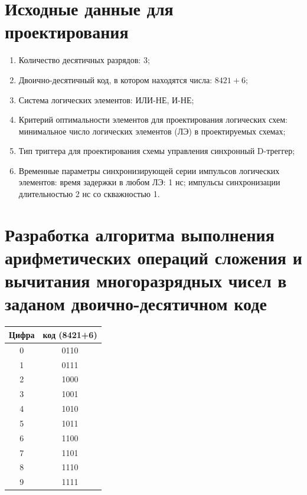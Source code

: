 \documentclass[a4paper,14pt]{article}
\begin{document}


\section{Исходные данные для проектирования}


\begin{enumerate}
	\item Количество десятичных разрядов: $3$;
	\item Двоично-десятичный код, в котором находятся числа: $8421+6$;
	\item Система логических элементов: ИЛИ-НЕ, И-НЕ;
	\item Критерий оптимальности элементов для проектирования логических схем: минимальное число логических элементов (ЛЭ) в проектируемых схемах;
	\item Тип триггера для проектирования схемы управления синхронный D-треггер;
	\item Временные параметры синхронизирующей серии импульсов логических элементов: 
	время задержки в любом ЛЭ: 1 нс; 
	импульсы синхронизации длительностью 2 нс со скважностью 1. 
\end{enumerate}

\section{Разработка алгоритма выполнения арифметических операций сложения и вычитания многоразрядных чисел в заданом двоично-десятичном коде}

\begin{table}[H]
	\begin{tabular}{|c|c|}
		\hline
		\multicolumn{1}{|l|}{Цифра} & \multicolumn{1}{l|}{код (8421+6)} \\ \hline
		0 & 0110 \\ \hline
		1 & 0111 \\ \hline
		2 & 1000 \\ \hline
		3 & 1001 \\ \hline
		4 & 1010 \\ \hline
		5 & 1011 \\ \hline
		6 & 1100 \\ \hline
		7 & 1101 \\ \hline
		8 & 1110 \\ \hline
		9 & 1111 \\ \hline
	\end{tabular}
\end{table}
\end{document}
